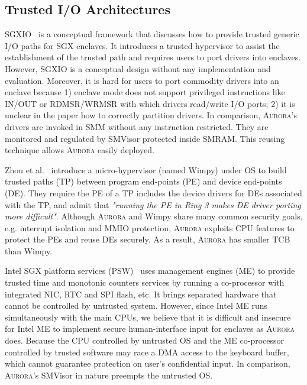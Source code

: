 \subsection{Trusted I/O Architectures}

SGXIO~\cite{weiser_sgxio:_2017} is a conceptual framework that discusses how to provide trusted generic I/O paths for SGX enclaves. It introduces a trusted hypervisor to assist the establishment of the trusted path and requires users to port drivers into enclaves. However, SGXIO is a conceptual design without any implementation and evaluation. Moreover, it is hard for users to port commodity drivers into an enclave because 1) enclave mode does not support privileged instructions like \textsf{IN/OUT} or \textsf{RDMSR/WRMSR} with which drivers read/write I/O ports; 2) it is unclear in the paper \cite{weiser_sgxio:_2017} how to correctly partition drivers. In comparison, \textsc{Aurora}'s drivers are invoked in SMM without any instruction restricted. They are monitored and regulated by SMVisor protected inside SMRAM. This reusing technique allows \textsc{Aurora} easily deployed.

Zhou et al.~\cite{zhou_dancing_2014} introduce a micro-hypervisor (named Wimpy) under OS to build trusted paths (TP) between program end-points (PE) and device end-points (DE). They require the PE of a TP includes the device drivers for DEs associated with the TP, and admit that \textit{"running the PE in Ring 3 makes DE driver porting more difficult"}.  Although \textsc{Aurora} and Wimpy share many common security goals, e.g. interrupt isolation and MMIO protection, \textsc{Aurora} exploits CPU features to protect the PEs and reuse DEs securely. As a result, \textsc{Aurora} has smaller TCB than Wimpy. 

Intel SGX platform services (PSW)~\cite{intel_psw} uses management engines (ME) to provide trusted time and monotonic counters services by running a co-processor with integrated NIC, RTC and SPI flash, etc. It brings separated hardware that cannot be controlled by untrusted system. However, since Intel ME runs simultaneously with the main CPUs, we believe that it is difficult and insecure for Intel ME to implement secure human-interface input for enclaves as \textsc{Aurora} does. Because the CPU controlled by untrusted OS and the ME co-processor controlled by trusted software may race a DMA access  to the keyboard buffer, which cannot guarantee protection on user's confidential input. In comparison, \textsc{Aurora}'s SMVisor in nature preempts the untrusted OS.

